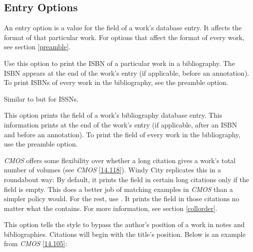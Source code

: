 \documentclass[11pt,letterpaper,oneside]{article}
\begin{document}
\subsection{Entry Options}
\label{entry}

An entry option is a value for the  field of a
work's database entry. It affects the format of that particular work.
For options that affect the format of every work, see section
\ref{preamble}.

\begin{optionlist}


\noindent Use this option to print the ISBN of a particular work in a
bibliography. The ISBN appears at the end of the work's entry (if
applicable, before an annotation). To print ISBNs of every work in the
bibliography, see the  preamble option.


\noindent Similar to  but for ISSNs.


\noindent This option prints the  field of a work's
bibliography database entry. This information prints at the end of the
work's entry (if applicable, after an ISBN and before an annotation).
To print the  field of every work in the
bibliography, use the  preamble option.


\noindent \textit{CMOS} offers some flexibility over whether a long
citation gives a work's total number of volumes (see \textit{CMOS}
\ref{14.118}). Windy City replicates this in a roundabout way: By
default, it prints the  field in certain long
citations only if the  field is empty. This does a
better job of matching examples in \textit{CMOS} than a simpler policy
would. For the rest, use . It prints the
 field in those citations no matter what the
 contains. For more information, see section
\ref{collorder}.


\noindent This option tells the style to bypass the author's position
of a work in notes and bibliographies. Citations will begin with the
title's position. Below is an example from \textit{CMOS} \ref{14.105}:


\end{optionlist}
\end{document}

